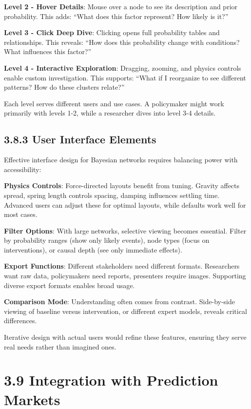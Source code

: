 \documentclass[
  11pt,
  letterpaper,
  openany]{book}
\begin{document}
\textbf{Level 2 - Hover Details}: Mouse over a node to see its
description and prior probability. This adds: ``What does this factor
represent? How likely is it?''

\textbf{Level 3 - Click Deep Dive}: Clicking opens full probability
tables and relationships. This reveals: ``How does this probability
change with conditions? What influences this factor?''

\textbf{Level 4 - Interactive Exploration}: Dragging, zooming, and
physics controls enable custom investigation. This supports: ``What if I
reorganize to see different patterns? How do these clusters relate?''

Each level serves different users and use cases. A policymaker might
work primarily with levels 1-2, while a researcher dives into level 3-4
details.

\subsection{3.8.3 User Interface Elements}\label{sec-ui-elements}

Effective interface design for Bayesian networks requires balancing
power with accessibility:

\textbf{Physics Controls}: Force-directed layouts benefit from tuning.
Gravity affects spread, spring length controls spacing, damping
influences settling time. Advanced users can adjust these for optimal
layouts, while defaults work well for most cases.

\textbf{Filter Options}: With large networks, selective viewing becomes
essential. Filter by probability ranges (show only likely events), node
types (focus on interventions), or causal depth (see only immediate
effects).

\textbf{Export Functions}: Different stakeholders need different
formats. Researchers want raw data, policymakers need reports,
presenters require images. Supporting diverse export formats enables
broad usage.

\textbf{Comparison Mode}: Understanding often comes from contrast.
Side-by-side viewing of baseline versus intervention, or different
expert models, reveals critical differences.

Iterative design with actual users would refine these features, ensuring
they serve real needs rather than imagined ones.

\section{3.9 Integration with Prediction
Markets}\label{sec-market-integration}
\end{document}
